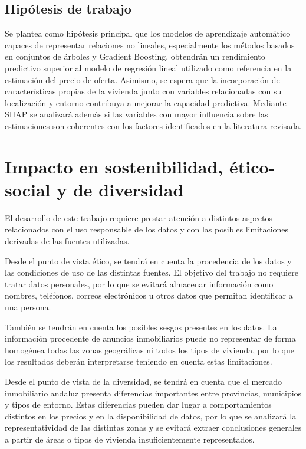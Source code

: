 \documentclass[IB]{TFUOC}%
\begin{document}
\subsection{Hipótesis de trabajo}

Se plantea como hipótesis principal que los modelos de aprendizaje automático capaces de representar relaciones no lineales, especialmente los métodos basados en conjuntos de árboles y Gradient Boosting, obtendrán un rendimiento predictivo superior al modelo de regresión lineal utilizado como referencia en la estimación del precio de oferta. Asimismo, se espera que la incorporación de características propias de la vivienda junto con variables relacionadas con su localización y entorno contribuya a mejorar la capacidad predictiva. Mediante SHAP se analizará además si las variables con mayor influencia sobre las estimaciones son coherentes con los factores identificados en la literatura revisada.

\section{Impacto en sostenibilidad, ético-social y de diversidad}
\label{s:etic}

El desarrollo de este trabajo requiere prestar atención a distintos aspectos relacionados con el uso responsable de los datos y con las posibles limitaciones derivadas de las fuentes utilizadas.

Desde el punto de vista ético, se tendrá en cuenta la procedencia de los datos y las condiciones de uso de las distintas fuentes. El objetivo del trabajo no requiere tratar datos personales, por lo que se evitará almacenar información como nombres, teléfonos, correos electrónicos u otros datos que permitan identificar a una persona.

También se tendrán en cuenta los posibles sesgos presentes en los datos. La información procedente de anuncios inmobiliarios puede no representar de forma homogénea todas las zonas geográficas ni todos los tipos de vivienda, por lo que los resultados deberán interpretarse teniendo en cuenta estas limitaciones.

Desde el punto de vista de la diversidad, se tendrá en cuenta que el mercado inmobiliario andaluz presenta diferencias importantes entre provincias, municipios y tipos de entorno. Estas diferencias pueden dar lugar a comportamientos distintos en los precios y en la disponibilidad de datos, por lo que se analizará la representatividad de las distintas zonas y se evitará extraer conclusiones generales a partir de áreas o tipos de vivienda insuficientemente representados.
\end{document}
